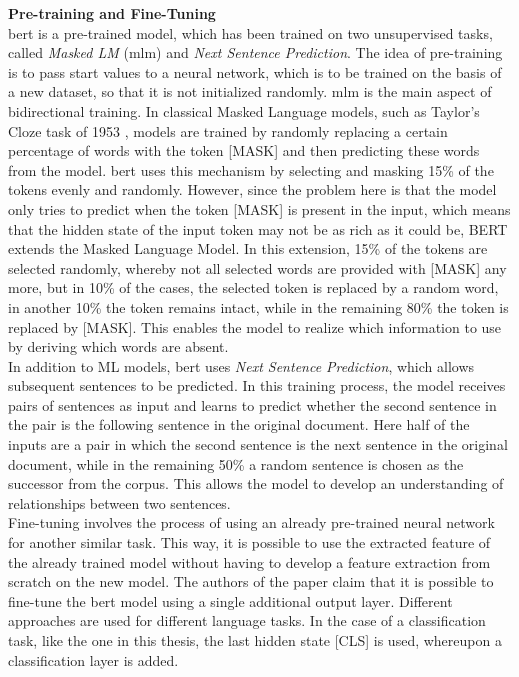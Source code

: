 \documentclass[a4paper, 11pt,titlepage,oneside,openany]{book}
\begin{document}
\noindent \textbf{Pre-training and Fine-Tuning}\\
\indent \gls{bert} is a pre-trained model, which has been trained on two unsupervised tasks, called \textit{Masked LM} (\gls{mlm}) and \textit{Next Sentence Prediction}. The idea of pre-training is to pass start values to a neural network, which is to be trained on the basis of a new dataset, so that it is not initialized randomly.
\newpage
\noindent \gls{mlm} is the main aspect of bidirectional training. In classical Masked Language models, such as Taylor's Cloze task of 1953 \cite{cloze}, models are trained by randomly replacing a certain percentage of words with the token [MASK] and then predicting these words from the model. \gls{bert} uses this mechanism by selecting and masking 15\% of the tokens evenly and randomly. However, since the problem here is that the model only tries to predict when the token [MASK] is present in the input, which means that the hidden state of the input token may not be as rich as it could be, BERT extends the Masked Language Model. In this extension, 15\% of the tokens are selected randomly, whereby not all selected words are provided with [MASK] any more, but in 10\% of the cases, the selected token is replaced by a random word, in another 10\% the token remains intact, while in the remaining 80\% the token is replaced by [MASK]. This enables the model to realize which information to use by deriving which words are absent.\\
\noindent In addition to ML models, \gls{bert} uses \textit{Next Sentence Prediction}, which allows subsequent sentences to be predicted. In this training process, the model receives pairs of sentences as input and learns to predict whether the second sentence in the pair is the following sentence in the original document. Here half of the inputs are a pair in which the second sentence is the next sentence in the original document, while in the remaining 50\% a random sentence is chosen as the successor from the corpus. This allows the model to develop an understanding of relationships between two sentences. \\

Fine-tuning involves the process of using an already pre-trained neural network for another similar task. This way, it is possible to use the extracted feature of the already trained model without having to develop a feature extraction from scratch on the new model. The authors of the paper claim that it is possible to fine-tune the \gls{bert} model using a single additional output layer. Different approaches are used for different language tasks. In the case of a classification task, like the one in this thesis, the last hidden state [CLS] is used, whereupon a classification layer is added. 
\end{document}
